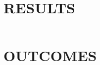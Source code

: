 \documentclass[a4paper, 10pt]{article}
\begin{document}
\begin{lstlisting}[language = C++]

\end{lstlisting}


\section{RESULTS}


\begin{lstlisting}[language = C++]

\end{lstlisting}

%
%


\section{OUTCOMES}
\end{document}
